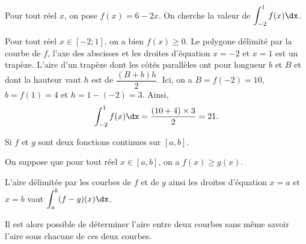 \documentclass[11pt,fleqn, openany]{book} %
\begin{document}
\begin{example} Pour tout réel $x$, on pose $f(x)=6-2x$. On cherche la valeur de $\displaystyle\int_{-2}^1 f(x)\dx$.


\begin{minipage}{0.3\linewidth}
\end{minipage}\hfill\begin{minipage}{0.65\linewidth}
Pour tout réel $x\in [-2;1]$, on a bien $f(x)\geqslant 0$.
\vskip5pt
Le polygone délimité par la courbe de $f$, l'axe des abscisses et les droites d'équation $x=-2$ et $x=1$ est un trapèze. 
\vskip5pt
L'aire d'un trapèze dont les côtés parallèles ont pour longueur $b$ et $B$ et dont la hauteur vaut $h$ est de $\dfrac{(B+b)h}{2}$.
\vskip5pt
Ici, on a $B=f(-2)=10$, $b=f(1)=4$ et $h=1-(-2)=3$. 
\vskip5pt
Ainsi, \[\displaystyle\int_{-2}^1 f(x)\dx = \dfrac{(10+4)\times 3}{2}=21.\]
\end{minipage}

\end{example}

\begin{proposition}Si $f$ et $g$ sont deux fonctions continues sur $[a,b]$.

On suppose que pour tout réel $x\in[a,b]$, on a $f(x) \geqslant g(x)$.

L'aire délimitée par les courbes de $f$ et de $g$ ainsi les droites d'équation $x=a$ et $x=b$ vaut $\displaystyle\int_{a}^b (f-g)(x)\dx$.\end{proposition}

Il est alors possible de déterminer l'aire entre deux courbes sans même savoir l'aire sous chacune de ces deux courbes.
\end{document}
